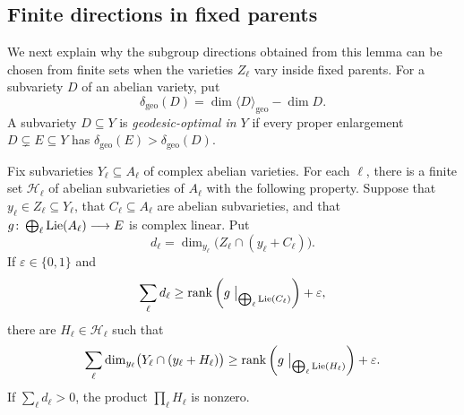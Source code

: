 \subsection{Finite directions in fixed parents}

We next explain why the subgroup directions obtained from this lemma
can be chosen from finite sets when the varieties $Z_\ell$ vary inside
fixed parents. For a subvariety $D$ of an abelian variety, put
\[
 \delta_{\mathrm{geo}}(D)
 =\dim\langle D\rangle_{\mathrm{geo}}-\dim D.
\]
A subvariety $D\subseteq Y$ is \emph{geodesic-optimal in $Y$} if every
proper enlargement $D\subsetneq E\subseteq Y$ has
$\delta_{\mathrm{geo}}(E)>\delta_{\mathrm{geo}}(D)$.

\begin{lemma}
\label{lem:finite-directions}
Fix subvarieties $Y_\ell\subseteq A_\ell$ of complex abelian varieties.
For each $\ell$, there is a finite set $\mathcal H_\ell$ of abelian
subvarieties of $A_\ell$ with the following property.
Suppose that $y_\ell\in Z_\ell\subseteq Y_\ell$, that
$C_\ell\subseteq A_\ell$ are abelian subvarieties, and that
$g\colon\bigoplus_\ell\operatorname{Lie}(A_\ell)\longrightarrow E$ is complex linear.
Put
\[
 d_\ell=\dim_{y_\ell}\bigl(Z_\ell\cap(y_\ell+C_\ell)\bigr).
\]
If $\varepsilon\in\{0,1\}$ and
\[
 \sum_\ell d_\ell\geq
 \operatorname{rank}\left(g\bigm|_{\bigoplus_\ell\operatorname{Lie}(C_\ell)}\right)
 +\varepsilon,
\]
there are $H_\ell\in\mathcal H_\ell$ such that
\begin{equation}\label{eq:fixed-parent-rank}
 \sum_\ell\dim_{y_\ell}
 \bigl(Y_\ell\cap(y_\ell+H_\ell)\bigr)
 \geq\operatorname{rank}\left(g\bigm|_{\bigoplus_\ell\operatorname{Lie}(H_\ell)}\right)
 +\varepsilon.
\end{equation}
If $\sum_\ell d_\ell>0$, the product $\prod_\ell H_\ell$ is nonzero.
\end{lemma}

